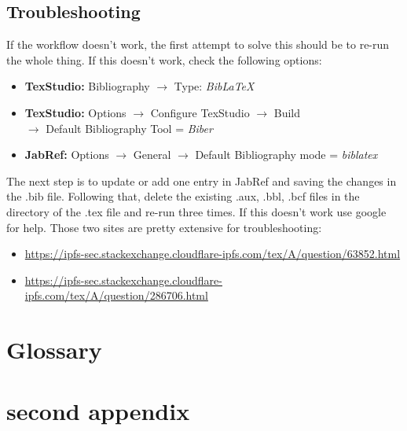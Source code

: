 \documentclass[a4paper]{scrartcl}
\begin{document}
	\subsection{Troubleshooting}
	
	If the workflow doesn't work, the first attempt to solve this should be to re-run the whole thing. If this doesn't work, check the following options:
	\begin{itemize}
		\item \textbf{TexStudio:} Bibliography $\rightarrow$ Type: \emph{BibLaTeX}
		\item \textbf{TexStudio:} Options $\rightarrow$ Configure TexStudio $\rightarrow$ Build\\ $\rightarrow$ Default Bibliography Tool = \emph{Biber}
		\item \textbf{JabRef:} Options $\rightarrow$ General $\rightarrow$ Default Bibliography mode = \emph{biblatex}
	\end{itemize}

The next step is to update or add one entry in JabRef and saving the changes in the .bib file. Following that, delete the existing .aux, .bbl, .bcf files in the directory of the .tex file and re-run three times. If this doesn't work use google for help. Those two sites are pretty extensive for troubleshooting:

\begin{itemize}
	\item \url{https://ipfs-sec.stackexchange.cloudflare-ipfs.com/tex/A/question/63852.html}
	\item 	\url{https://ipfs-sec.stackexchange.cloudflare-ipfs.com/tex/A/question/286706.html}
\end{itemize}

	\printbibliography
	
	\appendix
	\section{Glossary}
	\section{second appendix}
\end{document}
